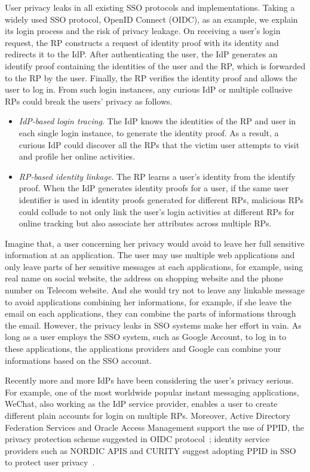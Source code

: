User privacy leaks in all existing SSO protocols and implementations.
Taking a widely used SSO protocol, OpenID Connect (OIDC), as an example, we explain its login process and the risk of privacy leakage. 
On receiving a user's login request, the RP constructs a request of identity proof with its identity and redirects it to the IdP. 
After authenticating the user, the IdP  generates an identify proof containing the identities of the user and the RP, which is forwarded to the RP by the user. 
Finally, the RP verifies the identity proof and allows the user to log in.
From such login instances, any curious IdP or multiple collusive RPs could break the users' privacy as follows.
\begin{itemize}
\item {\em IdP-based login tracing}. The IdP knows the identities of the RP and user in each single login instance, to generate the identity proof.
As a result, a curious IdP could discover all the RPs that the victim user attempts to visit and profile her online activities.
\item {\em RP-based identity linkage}. The RP learns a user's identity from the identify proof.
When the IdP generates identity proofs for a user, if the same user identifier is used in identity proofs generated for different RPs, malicious RPs could collude to not only link the user's login activities at different RPs for online tracking but also associate her attributes across multiple RPs.
\end{itemize}

Imagine that, a user concerning her privacy would avoid to leave her full sensitive information at an application. The user may use multiple web applications and only leave parts of her sensitive messages at each applications, for example, using real name on social website, the address on shopping website and the phone number on Telecom website. And she would try not to leave any linkable message to avoid applications combining her informations, for example, if she leave the email on each applications, they can combine the parts of informations through the email. However, the privacy leaks in SSO systems make her effort in vain. As long as a user employs the SSO system, such as Google Account, to log in to these applications, the applications providers and Google can combine your informations based on the SSO account.

Recently more and more IdPs have been considering the user's privacy serious. For example, one of the most worldwide popular instant messaging applications, WeChat, also working as the IdP service provider, enables a user to create different  plain accounts for login on multiple RPs. Moreover, Active Directory Federation Services and Oracle Access Management support the use of PPID, the privacy protection scheme suggested in OIDC protocol~\cite{MS, Oracle}; identity service providers such as NORDIC APIS and CURITY suggest adopting PPID in SSO to protect user privacy~\cite{Nordic, Curity}.

